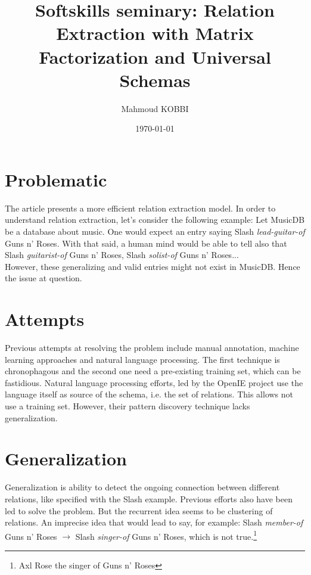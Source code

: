 \documentclass[11pt,a4paper]{article}
\title{Softskills seminary: Relation Extraction with Matrix Factorization and Universal Schemas}
\author{Mahmoud KOBBI}
\date{\today}
\affil{Paris-Saclay University, Paris, France}
\begin{document}
\maketitle

\section{Problematic}
The article presents a more efficient relation extraction model. In order to understand relation extraction, let's consider the following example: Let MusicDB be a database about music. One would expect an entry saying Slash \textit{lead-guitar-of} Guns n' Roses. With that said, a human mind would be able to tell also that Slash \textit{guitarist-of} Guns n' Roses, Slash \textit{solist-of} Guns n' Roses... \\

However, these generalizing and valid entries might not exist in MusicDB. Hence the issue at question.

\section{Attempts}

Previous attempts at resolving the problem include manual annotation, machine learning approaches and natural language processing. The first technique is chronophagous and the second one need a pre-existing training set, which can be fastidious. Natural language processing efforts, led by the OpenIE project use the language itself as source of the schema, i.e. the set of relations. This allows not use a training set. However, their pattern discovery technique lacks generalization.

\section{Generalization}

Generalization is ability to detect the ongoing connection between different relations, like specified with the Slash example.
Previous efforts also have been led to solve the problem. But the recurrent idea seems to be clustering of relations. An imprecise idea that would lead to say, for example:
Slash \textit{member-of} Guns n' Roses $\rightarrow$ Slash \textit{singer-of} Guns n' Roses, which is not true.\footnote{Axl Rose the singer of Guns n' Roses}
\end{document}
